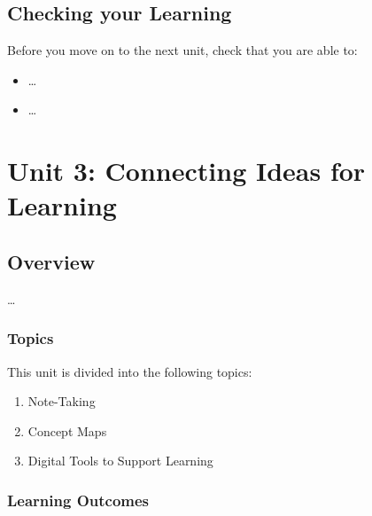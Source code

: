 \documentclass[
]{book}
\providecommand{\tightlist}{%
  \setlength{\itemsep}{0pt}\setlength{\parskip}{0pt}}
\theoremstyle{definition}
\theoremstyle{definition}
\theoremstyle{definition}
\theoremstyle{definition}
\theoremstyle{remark}
\begin{document}
\hypertarget{checking-your-learning-1}{%
\section*{Checking your Learning}\label{checking-your-learning-1}}

\begin{progress}
Before you move on to the next unit, check that you are able to:

\begin{itemize}
\tightlist
\item
  \ldots{}
\item
  \ldots{}
\end{itemize}
\end{progress}

\hypertarget{unit-3-connecting-ideas-for-learning}{%
\chapter{Unit 3: Connecting Ideas for Learning}\label{unit-3-connecting-ideas-for-learning}}

\hypertarget{overview-2}{%
\section*{Overview}\label{overview-2}}

\ldots{}

\hypertarget{topics-2}{%
\subsection*{Topics}\label{topics-2}}

This unit is divided into the following topics:

\begin{enumerate}
\def\labelenumi{\arabic{enumi}.}
\tightlist
\item
  Note-Taking
\item
  Concept Maps
\item
  Digital Tools to Support Learning
\end{enumerate}

\hypertarget{learning-outcomes-2}{%
\subsection*{Learning Outcomes}\label{learning-outcomes-2}}
\end{document}
